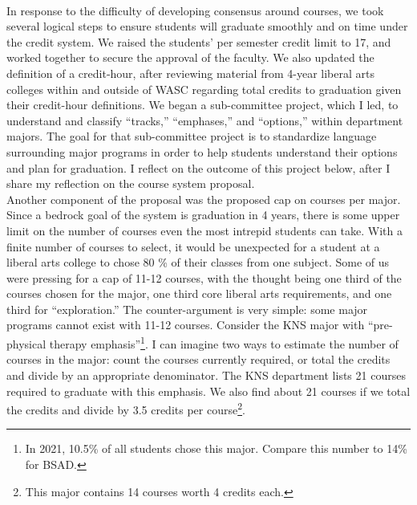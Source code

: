 \documentclass[../../../main.tex]{subfiles}
\begin{document}
\\
\vspace{0.25cm}
In response to the difficulty of developing consensus around courses, we took several logical steps to ensure students will graduate smoothly and on time under the credit system.  We raised the students' per semester credit limit to 17, and worked together to secure the approval of the faculty.  We also updated the definition of a credit-hour, after reviewing material from 4-year liberal arts colleges within and outside of WASC regarding total credits to graduation given their credit-hour definitions.  We began a sub-committee project, which I led, to understand and classify ``tracks,'' ``emphases,'' and ``options,'' within department majors.  The goal for that sub-committee project is to standardize language surrounding major programs in order to help students understand their options and plan for graduation.  I reflect on the outcome of this project below, after I share my reflection on the course system proposal.
\\
\vspace{0.25cm}
Another component of the proposal was the proposed cap on courses per major.  Since a bedrock goal of the system is graduation in 4 years, there is some upper limit on the number of courses even the most intrepid students can take.  With a finite number of courses to select, it would be unexpected for a student at a liberal arts college to chose 80 \% of their classes from one subject.  Some of us were pressing for a cap of 11-12 courses, with the thought being one third of the courses chosen for the major, one third core liberal arts requirements, and one third for ``exploration.''  The counter-argument is very simple: some major programs cannot exist with 11-12 courses.  Consider the KNS major with ``pre-physical therapy emphasis''\footnote{In 2021, 10.5\% of all students chose this major.  Compare this number to 14\% for BSAD.}.  I can imagine two ways to estimate the number of courses in the major: count the courses currently required, or total the credits and divide by an appropriate denominator.  The KNS department lists 21 courses required to graduate with this emphasis.  We also find about 21 courses if we total the credits and divide by 3.5 credits per course\footnote{This major contains 14 courses worth 4 credits each.}.
\\
\vspace{0.25cm}
\end{document}
